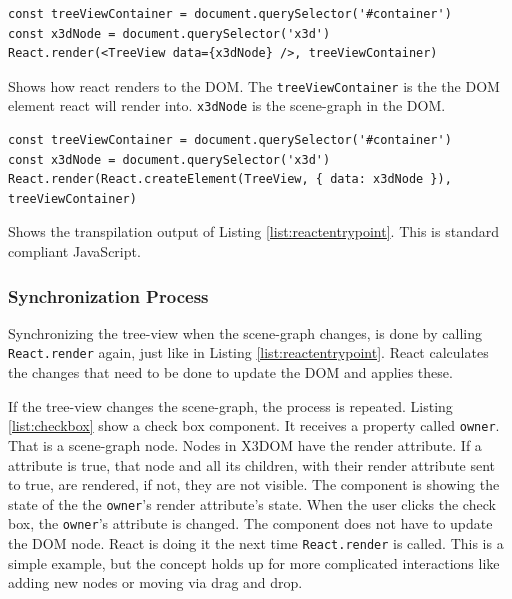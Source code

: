 \begin{listing}
  \begin{verbatim}
const treeViewContainer = document.querySelector('#container')
const x3dNode = document.querySelector('x3d')
React.render(<TreeView data={x3dNode} />, treeViewContainer)
  \end{verbatim}
  \caption{Shows how react renders to the \gls{DOM}. The \texttt{treeViewContainer} is the the \gls{DOM} element react will render into. \texttt{x3dNode} is the scene-graph in the \gls{DOM}.}
  \label{list:reactentrypoint}
\end{listing}

\begin{listing}
  \begin{verbatim}
const treeViewContainer = document.querySelector('#container')
const x3dNode = document.querySelector('x3d')
React.render(React.createElement(TreeView, { data: x3dNode }), treeViewContainer)
  \end{verbatim}
  \caption{Shows the transpilation output of Listing \ref{list:reactentrypoint}. This is standard compliant JavaScript.}
  \label{list:reacttranspiled}
\end{listing}

\subsubsection{Synchronization Process}
\label{synchronization-process}

Synchronizing the tree-view when the scene-graph changes, is done by calling
\texttt{React.render} again, just like in Listing \ref{list:reactentrypoint}. React
calculates the changes that need to be done to update the \gls{DOM} and applies these.

If the tree-view changes the scene-graph, the process is repeated. Listing
\ref{list:checkbox} show a check box component. It receives a property called
\texttt{owner}. That is a scene-graph node. Nodes in X3DOM have the render
attribute. If a attribute is true, that node and all its children, with their render attribute sent to true, are rendered,
if not, they are not visible. The component is showing the state of the the
\texttt{owner}'s render attribute's state. When the user clicks the check box, the
\texttt{owner}'s attribute is changed. The component does not have to update the
\gls{DOM} node. React is doing it the next time \texttt{React.render} is called. This
is a simple example, but the concept holds up for more complicated interactions
like adding new nodes or moving via drag and drop.


